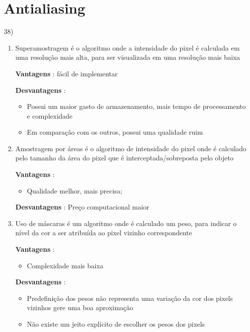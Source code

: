 \section*{Antialiasing}

 	        38) \begin{enumerate}[label=\alph*.]
					\setlength\itemsep{1em}
		
					\item Superamostragem é o algoritmo onde a intensidade do pixel é calculada em uma resolução mais alta, para ser visualizada em uma resolução mais baixa
					
					\textbf{Vantagens} :  fácil de implementar
					
					\textbf{Desvantagens} :
					\begin{itemize}
						\item  Possui um maior gasto de armazenamento, mais
					tempo de processamento e complexidade
						\item Em comparação com os outros, possui uma qualidade ruim
					\end{itemize}
		
					\item Amostragem por áreas é o algoritmo de intensidade do pixel onde é calculado pelo tamanho da área do pixel que é interceptada/sobreposta pelo objeto
					
					\textbf{Vantagens} : 
					
					\begin{itemize}
							\item Qualidade melhor, mais precisa;
					\end{itemize}
																 
					\textbf{Desvantagens} : Preço computacional maior
		
					\item Uso de máscaras é um algoritmo onde é calculado um peso, para indicar o nível
					da cor a ser atribuída ao pixel vizinho correspondente
					
					\textbf{Vantagens} :  
					
					\begin{itemize}
						\item Complexidade mais baixa
					\end{itemize}
					
					\textbf{Desvantagens} : 
					\begin{itemize}
						\item Predefinição dos pesos não representa uma variação
					da cor dos pixels vizinhos gere uma boa aproximação
						\item Não existe um jeito explícito de escolher os pesos dos pixels
					\end{itemize}
					

\end{enumerate}
